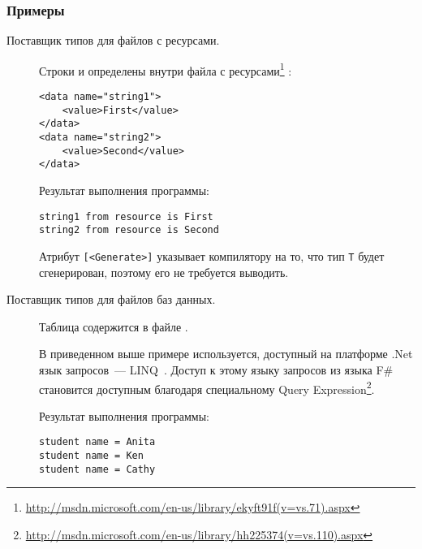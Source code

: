 \subsubsection{Примеры}
\begin{description}
\item[Поставщик типов для файлов с ресурсами.] Строки  и  определены внутри файла с ресурсами\footnote{\url{http://msdn.microsoft.com/en-us/library/ekyft91f(v=vs.71).aspx}} :
\begin{code}
\begin{lstlisting}[caption={Пример файла с ресурсами.}, label=resource-resx]
<data name="string1">
    <value>First</value>
</data>
<data name="string2">
    <value>Second</value>
</data>
\end{lstlisting}
\end{code}

\begin{code}

\end{code}
\begin{code}
Результат выполнения программы:
\begin{lstlisting}[caption={Результат выполнения программы \ref{resource-type-provider}.}]
string1 from resource is First
string2 from resource is Second
\end{lstlisting}
\end{code}

Атрибут \texttt{[<Generate>]} указывает компилятору на то, что тип \texttt{T} будет сгенерирован, поэтому его не требуется выводить.

\clearpage

\item[Поставщик типов для файлов баз данных.] Таблица  содержится в файле .
\begin{code}

\end{code}

В приведенном выше примере используется, доступный на платформе .Net язык запросов~--- LINQ~\cite{linq}.
Доступ к этому языку запросов из языка F\# становится доступным благодаря специальному Query Expression\footnote{\url{http://msdn.microsoft.com/en-us/library/hh225374(v=vs.110).aspx}}.

Результат выполнения программы:
\begin{lstlisting}[caption={Результат выполнения программы \ref{dbml-type-provider}.}, label=dbml-result]
student name = Anita
student name = Ken
student name = Cathy
\end{lstlisting}

\end{description}

